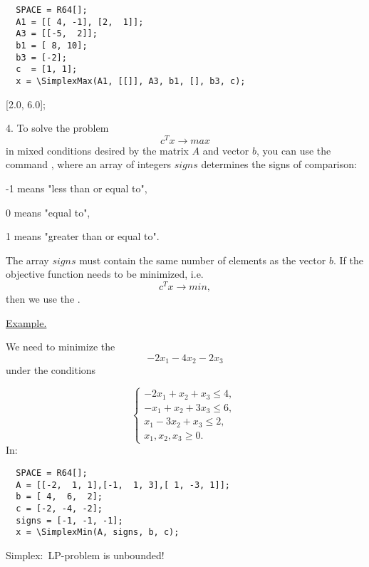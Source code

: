 \begin{verbatim}
  SPACE = R64[];
  A1 = [[ 4, -1], [2,  1]];
  A3 = [[-5,  2]];
  b1 = [ 8, 10];
  b3 = [-2];
  c  = [1, 1];
  x = \SimplexMax(A1, [[]], A3, b1, [], b3, c);
\end{verbatim}
\ex{}
{[2.0, 6.0];}

4. To solve the problem
$$c^Tx \rightarrow max$$
in mixed conditions desired by the matrix  $A$ and vector $b$,
you can use the command ,  
where an array of integers $ signs $ determines the signs of comparison:

-1 means "less than or equal to",

0 means "equal to", 

1  means "greater than or equal to".

The array $signs$ must contain the same number of elements as the vector $ b $.
If the objective function needs to be minimized, i.e. $$c^Tx \rightarrow min,$$  then we use the   .

\underline{%
Example.%
}

We need to minimize the 
 $$-2x_1-4x_2-2x_3$$
under the conditions

$$%
  \left\{
  \begin{array}{c}%
  -2x_1 +  x_2 +  x_3 \leqslant 4,\ \\
  - x_1 +  x_2 + 3x_3 \leqslant 6,\ \\
    x_1 - 3x_2 +  x_3 \leqslant 2,\ \\
    x_1,   x_2,   x_3 \geqslant 0.%
  \end{array}
  \right.%
$$
In:
\begin{verbatim}
  SPACE = R64[];
  A = [[-2,  1, 1],[-1,  1, 3],[ 1, -3, 1]];   
  b = [ 4,  6,  2];
  c = [-2, -4, -2]; 
  signs = [-1, -1, -1];
  x = \SimplexMin(A, signs, b, c);
\end{verbatim}
\ex{}
{ Simplex:\ LP-problem is unbounded!}

